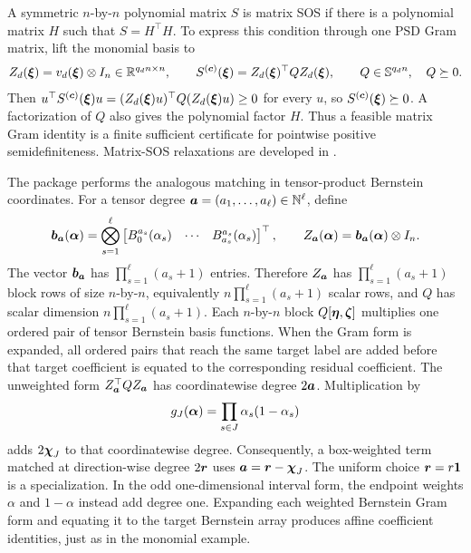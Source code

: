 A symmetric $n$-by-$n$ polynomial matrix $S$ is matrix SOS if there is a polynomial matrix $H$ such that $S=H^\top H$. To express this condition through one PSD Gram matrix, lift the monomial basis to
\begin{gather*}
  Z_d(\boldsymbol{\xi})=v_d(\boldsymbol{\xi})\otimes I_n
  \in\mathbb R^{q_d n\times n},
  \qquad
  S^{(\boldsymbol{c})}(\boldsymbol{\xi})
  =Z_d(\boldsymbol{\xi})^\top QZ_d(\boldsymbol{\xi}),
  \qquad
  Q\in\mathbb S^{q_d n},\quad Q\succeq0.
\end{gather*}
Then $u^\top S^{(\boldsymbol{c})}(\boldsymbol{\xi})u=(Z_d(\boldsymbol{\xi})u)^\top Q(Z_d(\boldsymbol{\xi})u)\ge0$ for every $u$, so $S^{(\boldsymbol{c})}(\boldsymbol{\xi})\succeq0$. A factorization of $Q$ also gives the polynomial factor $H$. Thus a feasible matrix Gram identity is a finite sufficient certificate for pointwise positive semidefiniteness. Matrix-SOS relaxations are developed in \cite{schererhol2006}.

The package performs the analogous matching in tensor-product Bernstein coordinates. For a tensor degree $\boldsymbol{a}=(a_1,\ldots,a_\ell)\in\mathbb N^\ell$, define
\begin{gather*}
  \boldsymbol{b}_{\boldsymbol{a}}(\boldsymbol{\alpha})
  =
  \bigotimes_{s=1}^{\ell}
  \begin{bmatrix}
    B_0^{a_s}(\alpha_s)&\cdots&B_{a_s}^{a_s}(\alpha_s)
  \end{bmatrix}^\top,
  \qquad
  Z_{\boldsymbol{a}}(\boldsymbol{\alpha})
  =\boldsymbol{b}_{\boldsymbol{a}}(\boldsymbol{\alpha})\otimes I_n.
\end{gather*}
The vector $\boldsymbol{b}_{\boldsymbol{a}}$ has $\prod_{s=1}^{\ell}(a_s+1)$ entries. Therefore $Z_{\boldsymbol{a}}$ has $\prod_{s=1}^{\ell}(a_s+1)$ block rows of size $n$-by-$n$, equivalently $n\prod_{s=1}^{\ell}(a_s+1)$ scalar rows, and $Q$ has scalar dimension $n\prod_{s=1}^{\ell}(a_s+1)$. Each $n$-by-$n$ block $Q[\boldsymbol{\eta},\boldsymbol{\zeta}]$ multiplies one ordered pair of tensor Bernstein basis functions. When the Gram form is expanded, all ordered pairs that reach the same target label are added before that target coefficient is equated to the corresponding residual coefficient. The unweighted form $Z_{\boldsymbol{a}}^\top QZ_{\boldsymbol{a}}$ has coordinatewise degree $2\boldsymbol{a}$. Multiplication by
\begin{gather*}
  g_J(\boldsymbol{\alpha})
  =\prod_{s\in J}\alpha_s(1-\alpha_s)
\end{gather*}
adds $2\boldsymbol{\chi}_J$ to that coordinatewise degree. Consequently, a box-weighted term matched at direction-wise degree $2\boldsymbol{r}$ uses $\boldsymbol{a}=\boldsymbol{r}-\boldsymbol{\chi}_J$. The uniform choice $\boldsymbol{r}=r\boldsymbol{1}$ is a specialization. In the odd one-dimensional interval form, the endpoint weights $\alpha$ and $1-\alpha$ instead add degree one. Expanding each weighted Bernstein Gram form and equating it to the target Bernstein array produces affine coefficient identities, just as in the monomial example.

